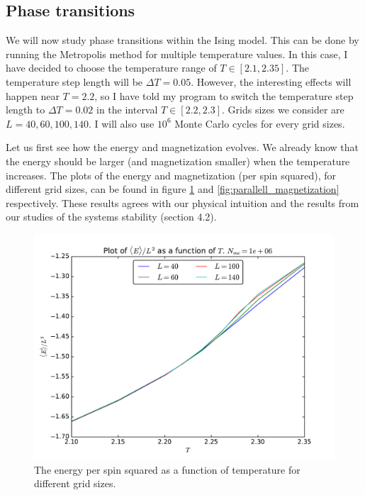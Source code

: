 \documentclass[12pt]{article}
\begin{document}
\FloatBarrier
\subsection{Phase transitions}
We will now study phase transitions within the Ising model. This can be done by running the Metropolis method for multiple temperature values. In this case, I have decided to choose the temperature range of $T\in [2.1, 2.35]$. The temperature step length will be $\Delta T = 0.05$. However, the interesting effects will happen near $T=2.2$, so I have told my program to switch the temperature step length to $\Delta T = 0.02$ in the interval $T\in[2.2,2.3]$. Grids sizes we consider are $L=40,60,100,140$. I will also use $10^6$ Monte Carlo cycles for every grid sizes.

Let us first see how the energy and magnetization evolves. We already know that the energy should be larger (and magnetization smaller) when the temperature increases. The plots of the energy and magnetization (per spin squared), for different grid sizes, can be found in figure \ref{fig:parallell_energy} and \ref{fig:parallell_magnetization} respectively. These results agrees with our physical intuition and the results from our studies of the systems stability (section 4.2). 
\begin{figure}[H]
\centering
\includegraphics[width=\linewidth]{Plots/Energy_parallellization.pdf}\caption{The energy per spin squared as a function of temperature for different grid sizes.}
\label{fig:parallell_energy}
\end{figure}
\end{document}
